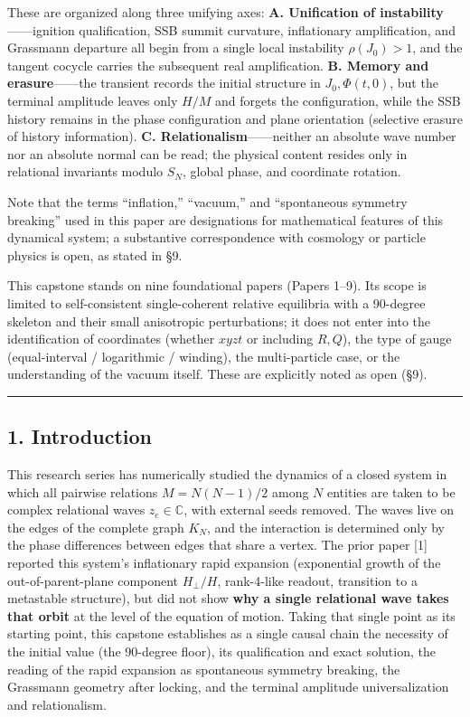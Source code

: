 \documentclass[
  a4paper,
]{ltjsarticle}
\begin{document}
These are organized along three unifying axes: \textbf{A. Unification of
instability}------ignition qualification, SSB summit curvature,
inflationary amplification, and Grassmann departure all begin from a
single local instability \(\rho(J_0)>1\), and the tangent cocycle
carries the subsequent real amplification. \textbf{B. Memory and
erasure}------the transient records the initial structure in
\(J_0,\Phi(t,0)\), but the terminal amplitude leaves only \(H/M\) and
forgets the configuration, while the SSB history remains in the phase
configuration and plane orientation (selective erasure of history
information). \textbf{C. Relationalism}------neither an absolute wave
number nor an absolute normal can be read; the physical content resides
only in relational invariants modulo \(S_N\), global phase, and
coordinate rotation.

Note that the terms ``inflation,'' ``vacuum,'' and ``spontaneous
symmetry breaking'' used in this paper are designations for mathematical
features of this dynamical system; a substantive correspondence with
cosmology or particle physics is open, as stated in §9.

This capstone stands on nine foundational papers (Papers 1--9). Its
scope is limited to self-consistent single-coherent relative equilibria
with a 90-degree skeleton and their small anisotropic perturbations; it
does not enter into the identification of coordinates (whether \(xyzt\)
or including \(R,Q\)), the type of gauge (equal-interval / logarithmic /
winding), the multi-particle case, or the understanding of the vacuum
itself. These are explicitly noted as open (§9).

\begin{center}\rule{0.5\linewidth}{0.5pt}\end{center}

\subsection{1. Introduction}\label{introduction}

This research series has numerically studied the dynamics of a closed
system in which all pairwise relations \(M=N(N-1)/2\) among \(N\)
entities are taken to be complex relational waves \(z_e\in\mathbb C\),
with external seeds removed. The waves live on the edges of the complete
graph \(K_N\), and the interaction is determined only by the phase
differences between edges that share a vertex. The prior paper {[}1{]}
reported this system's inflationary rapid expansion (exponential growth
of the out-of-parent-plane component \(H_\perp/H\), rank-4-like readout,
transition to a metastable structure), but did not show \textbf{why a
single relational wave takes that orbit} at the level of the equation of
motion. Taking that single point as its starting point, this capstone
establishes as a single causal chain the necessity of the initial value
(the 90-degree floor), its qualification and exact solution, the reading
of the rapid expansion as spontaneous symmetry breaking, the Grassmann
geometry after locking, and the terminal amplitude universalization and
relationalism.
\end{document}
